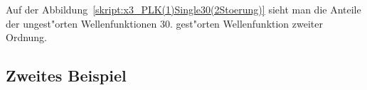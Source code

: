 \begin{refsection}
Auf der Abbildung~\ref{skript:x3_PLK(1)Single30(2Stoerung)} sieht man die Anteile der ungest"orten Wellenfunktionen 30. gest"orten Wellenfunktion zweiter Ordnung.

\subsection{Zweites Beispiel}













\end{refsection}
